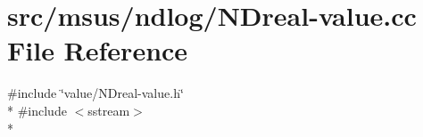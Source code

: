 \hypertarget{_n_dreal-value_8cc}{\section{src/msus/ndlog/\-N\-Dreal-\/value.cc File Reference}
\label{_n_dreal-value_8cc}
}
{\ttfamily \#include \char`\"{}value/\-N\-Dreal-\/value.\-h\char`\"{}}\\*
{\ttfamily \#include $<$sstream$>$}\\*
